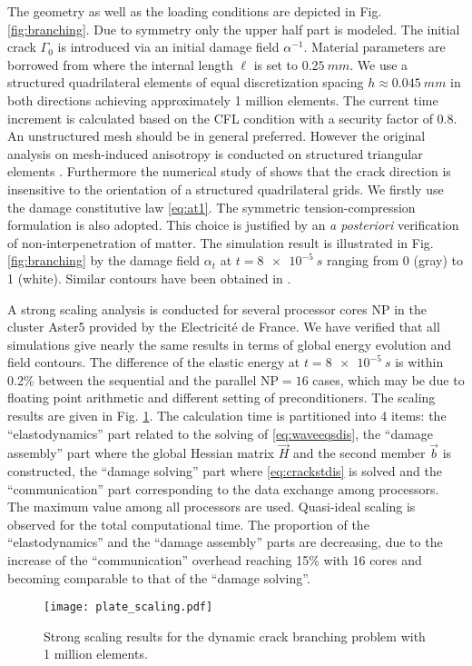 The geometry as well as the loading conditions are depicted in Fig. \ref{fig:branching}. Due to symmetry only the upper half part is modeled. The initial crack $\Gamma_0$ is introduced via an initial damage field $\alpha^{-1}$. Material parameters are borrowed from \cite{BordenVerhooselScottHughesLandis:2012} where the internal length $\ell$ is set to $\SI{0.25}{mm}$. We use a structured quadrilateral elements of equal discretization spacing $h\approx\SI{0.045}{mm}$ in both directions achieving approximately 1 million elements. The current time increment is calculated based on the CFL condition with a security factor of 0.8. An unstructured mesh should be in general preferred. However the original analysis on mesh-induced anisotropy is conducted on structured triangular elements \cite{Negri:1999}. Furthermore the numerical study of \cite{LorentzGodard:2011} shows that the crack direction is insensitive to the orientation of a structured quadrilateral grids. We firstly use the damage constitutive law \eqref{eq:at1}. The symmetric tension-compression formulation is also adopted. This choice is justified by an \emph{a posteriori} verification of non-interpenetration of matter. The simulation result is illustrated in Fig. \ref{fig:branching} by the damage field $\alpha_t$ at $t=\SI{8e-5}{s}$ ranging from 0 (gray) to 1 (white). Similar contours have been obtained in \cite{BordenVerhooselScottHughesLandis:2012,SchlueterWillenbuecherKuhnMueller:2014}.

A strong scaling analysis is conducted for several processor cores $\mathrm{NP}$ in the cluster Aster5 \cite{DelmasLefebvre:2014} provided by the Electricité de France. We have verified that all simulations give nearly the same results in terms of global energy evolution and field contours. The difference of the elastic energy at $t=\SI{8e-5}{s}$ is within 0.2\% between the sequential and the parallel $\mathrm{NP}=16$ cases, which may be due to floating point arithmetic and different setting of preconditioners. The scaling results are given in Fig. \ref{fig:scaling}. The calculation time is partitioned into 4 items: the ``elastodynamics'' part related to the solving of \eqref{eq:waveeqsdis}, the ``damage assembly'' part where the global Hessian matrix $\vec{H}$ and the second member $\vec{b}$ is constructed, the ``damage solving'' part where \eqref{eq:crackstdis} is solved and the ``communication'' part corresponding to the data exchange among processors. The maximum value among all processors are used. Quasi-ideal scaling is observed for the total computational time. The proportion of the ``elastodynamics'' and the ``damage assembly'' parts are decreasing, due to the increase of the ``communication'' overhead reaching 15\% with 16 cores and becoming comparable to that of the ``damage solving''.
\begin{figure}[htbp]
\centering
\texttt{[image: plate\_scaling.pdf]}
\caption{Strong scaling results for the dynamic crack branching problem with 1 million elements.} \label{fig:scaling}
\end{figure}

